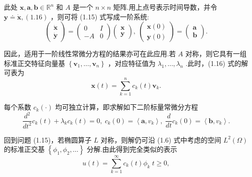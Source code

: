 此处 $\bm{x},\bm{a},\bm{b} \in  {\mathbb{R}}^{n}$ 和 $A$ 是一个 $n \times  n$ 矩阵.用上点号表示时间导数，并令 $\bm{y} \doteq  \dot{\bm{x}},\left( {1.16}\right)$ ，则可将 (1.15) 式写成一阶系统:
\begin{equation}\tag{1.17}
\left( \begin{array}{l} \dot{\bm{x}} \\  \dot{\bm{y}} \end{array}\right)  = \left( \begin{matrix} 0 & I \\   - A & 0 \end{matrix}\right) \left( \begin{array}{l} \bm{x} \\  \bm{y} \end{array}\right) ,\;\left( \begin{array}{l} \bm{x}\left( 0\right) \\  \bm{y}\left( 0\right)  \end{array}\right)  = \left( \begin{array}{l} \bm{a} \\  \bm{b} \end{array}\right) .
\end{equation}

因此，适用于一阶线性常微分方程的结果亦可在此应用.若 $A$ 对称，则它具有一组标准正交特征向量基 $\left\{  {{\bm{v}}_{1},\ldots ,{\bm{v}}_{n}}\right\}$ ，对应特征值为 ${\lambda }_{1},\ldots ,{\lambda }_{n}$ .此时，(1.16) 式的解可表为
\begin{equation}\tag{1.18}
\bm{x}\left( t\right)  = \mathop{\sum }\limits_{{k = 1}}^{n}{c}_{k}\left( t\right) {\bm{v}}_{k}.
\end{equation}

每个系数 ${c}_{k}\left( \cdot \right)$ 均可独立计算，即求解如下二阶标量常微分方程
\[
\frac{{d}^{2}}{d{t}^{2}}{c}_{k}\left( t\right)  + {\lambda }_{k}{c}_{k}\left( t\right)  = 0,\;{c}_{k}\left( 0\right)  = \left\langle  {\bm{a},{v}_{k}}\right\rangle  ,\;\frac{d}{dt}{c}_{k}\left( 0\right)  = \left\langle  {\bm{b},{v}_{k}}\right\rangle  .
\]

回到问题 (1.15)，若椭圆算子 $L$ 对称，则解仍可沿 (1.6) 式中考虑的空间 $L^2\left( \Omega \right)$ 的标准正交基 $\left\{  {{\phi }_{1},{\phi }_{2},\ldots }\right\}$ 分解.由此得到完全类似的表示
\begin{equation}\tag{1.19}
u\left( t\right)  = \mathop{\sum }\limits_{{k = 1}}^{\infty }{c}_{k}\left( t\right) {\phi }_{k}\;t \geq  0,
\end{equation}

